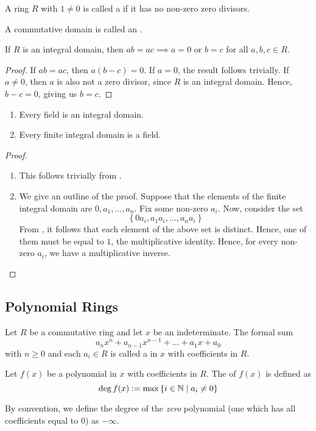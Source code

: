 \begin{defn}[Domain]
    A ring $R$ with $1 \neq 0$ is called a  if it has no non-zero zero divisors.
\end{defn}
\begin{defn}
    A commutative domain is called an .
\end{defn}
\begin{prop} \label{prop:ab-equals-ac}
    If $R$ is an integral domain, then $ab = ac \implies a = 0$ or $b=c$ for all $a,b,c \in R$.
\end{prop}
\begin{proof}
    If $ab = ac$, then $a(b-c) = 0$. If $a=0$, the result follows trivially.  If $a \neq 0$, then $a$ is also not a zero divisor, since $R$ is an integral domain. Hence, $b-c = 0$, giving us $b=c$.
\end{proof}
\begin{prop} \label{prop:field-and-integral-domain}
    \phantom{hi}
    \begin{enumerate}
        \item Every field is an integral domain.
        \item Every finite integral domain is a field.
    \end{enumerate}
\end{prop}
\begin{proof}
    \phantom{hi}
    \begin{enumerate}
        \item This follows trivially from .
        \item We give an outline of the proof. Suppose that the elements of the finite integral domain are $0, a_1, \ldots, a_n$. Fix some non-zero $a_i$. Now, consider the set
        \[
            \left\{ 0a_i, a_1a_i, \ldots, a_na_i \right\}
        \]
        From , it follows that each element of the above set is distinct. Hence, one of them must be equal to $1$, the multiplicative identity. Hence, for every non-zero $a_i$, we have a multiplicative inverse.
    \end{enumerate}
\end{proof}
\subsection{Polynomial Rings} \label{sec:poly}

\begin{defn}[Polynomial]
    Let $R$ be a commutative ring and let $x$ be an indeterminate. The formal sum
    \[
        a_nx^n + a_{n-1}x^{n-1} + \ldots + a_1x + a_0
    \]  
    with $n \geq 0$ and each $a_i \in R$ is called a  in $x$ with coefficients in $R$.
\end{defn}
\begin{defn}[Degree]
    Let $f(x)$ be a polynomial in $x$ with coefficients in $R$. The  of $f(x)$ is defined as
    \[
        \deg f(x) \vcentcolon= \max\left\{ i \in \mathbb{N} \mid a_i \neq 0 \right\}
    \]
\end{defn}
By convention, we define the degree of the \emph{zero} polynomial (one which has all coefficients equal to $0$) as $-\infty$.


